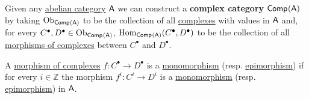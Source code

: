 \documentclass[../../../main]{subfiles}
\begin{document}
\begin{definition} \label{def:complex-category}
  Given any \hyperref[def:abelian-category]{abelian category} \(\mathsf{A}\) we can construct a \textbf{complex category} \(\mathsf{Comp}^{}(\mathsf{A})\) by taking
  \(\operatorname{Ob}_{\mathsf{Comp}^{}(\mathsf{A})}\) to be the collection of all \hyperref[def:complex]{complexes} with values in \(\mathsf{A}\) and, for every \(C^{\bullet}, D^{\bullet} \in \operatorname{Ob}_{\mathsf{Comp}^{}(\mathsf{A})}\), \(\operatorname{Hom}_{\mathsf{Comp}^{}(\mathsf{A})}(C^{\bullet}, D^{\bullet})\) to be the collection of all \hyperref[def:complex-morphism]{morphisms of complexes} between \(C^{\bullet}\) and \(D^{\bullet}\).
\end{definition}

\begin{remark} \label{remark:mono-epi-in-complexes}
  A \hyperref[def:complex-morphism]{morphism of complexes} \(f: C^{\bullet} \to D^{\bullet}\) is a \hyperref[def:mono-epi-morphism]{monomorphism} (resp. \hyperref[def:mono-epi-morphism]{epimorphism}) if for every \(i \in \mathbb{Z}\) the morphism \(f^{i}: C^{i} \to D^{i}\) is a \hyperref[def:mono-epi-morphism]{monomorphism} (resp. \hyperref[def:mono-epi-morphism]{epimorphism}) in \(\mathsf{A}\).
\end{remark}
\end{document}
